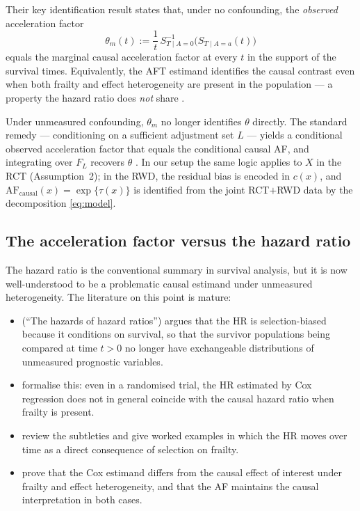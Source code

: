 \documentclass[11pt]{article}
\newcommand{\tauf}{\tau}
\newcommand{\cf}{c}
\newcommand{\AF}{\mathrm{AF}}
\begin{document}
Their key identification result \citep[Theorem~3.1]{Brathovde2024} states
that, under no confounding, the \emph{observed} acceleration factor
\begin{equation}
  \theta_{m}(t) := \frac{1}{t}\,
  S^{-1}_{T \mid A=0}\!\bigl(S_{T \mid A=a}(t)\bigr)
\end{equation}
equals the marginal causal acceleration factor at every $t$ in the support
of the survival times. Equivalently, the AFT estimand identifies the
causal contrast even when both frailty and effect heterogeneity are
present in the population --- a property the hazard ratio does \emph{not}
share \citep[see also][]{Hernan2010, MartinussenVansteelandtAndersen2020,
Post2024b}.

Under unmeasured confounding, $\theta_{m}$ no longer identifies $\theta$
directly. The standard remedy --- conditioning on a sufficient adjustment
set $L$ --- yields a conditional observed acceleration factor that equals
the conditional causal AF, and integrating over $F_{L}$ recovers $\theta$
\citep{Brathovde2024}. In our setup the same logic applies to $X$ in the
RCT (Assumption~2); in the RWD, the residual bias is encoded in $\cf(x)$,
and $\AF_{\mathrm{causal}}(x) = \exp\{\tauf(x)\}$ is identified from the
joint RCT$+$RWD data by the decomposition \eqref{eq:model}.

\subsection{The acceleration factor versus the hazard ratio}

The hazard ratio is the conventional summary in survival analysis, but it
is now well-understood to be a problematic causal estimand under
unmeasured heterogeneity. The literature on this point is mature:

\begin{itemize}[leftmargin=*]
  \item \citet{Hernan2010} (``The hazards of hazard ratios'') argues that
        the HR is selection-biased because it conditions on survival,
        so that the survivor populations being compared at time $t > 0$
        no longer have exchangeable distributions of unmeasured
        prognostic variables.
  \item \citet{Aalen2015} formalise this: even in a randomised
        trial, the HR estimated by Cox regression does not in general
        coincide with the causal hazard ratio when frailty is present.
  \item \citet{MartinussenVansteelandtAndersen2020} review the subtleties
        and give worked examples in which the HR moves over time as a
        direct consequence of selection on frailty.
  \item \citet{Post2024b} prove that the Cox estimand differs from the
        causal effect of interest under frailty and effect heterogeneity,
        and that the AF maintains the causal interpretation in both
        cases.
\end{itemize}
\end{document}
